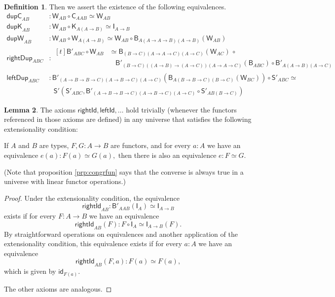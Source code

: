 \documentclass[a4paper]{article}
\theoremstyle{definition}
\newtheorem{definition}{Definition}[section]
\newtheorem{lemma}[definition]{Lemma}
\theoremstyle{remark}
\renewcommand{\equiv}{\simeq}
\newcommand{\nm}{\mathsf}
\newcommand{\id}{\nm{id}}
\newcommand{\combinator}{\nm}
\newcommand{\idFun}{\combinator{I}}
\newcommand{\constFun}{\combinator{K}}
\newcommand{\compFun}{\combinator{B'}}
\newcommand{\revCompFun}{\combinator{B}}
\newcommand{\swapFun}{\combinator{C}}
\newcommand{\dupFun}{\combinator{W}}
\newcommand{\substFun}{\combinator{S'}}
\begin{document}
\begin{definition}
  Then we assert the existence of the following equivalences.
  \begin{align*}
    \nm{dupC}_{AB}      &: \dupFun_{AB} \circ \swapFun_{AAB} \equiv \dupFun_{AB}\\
    \nm{dupK}_{AB}      &: \dupFun_{AB} \circ \constFun_{A(A{\to}B)} \equiv \idFun_{A{\to}B}\\
    \nm{dupW}_{AB}      &: \dupFun_{AB} \circ \dupFun_{A(A{\to}B)} \equiv \dupFun_{AB} \circ \revCompFun_{A(A{\to}A{\to}B)(A{\to}B)}(\dupFun_{AB})\\
    \nm{rightDup}_{ABC} &: \begin{aligned}[t]\compFun_{ABC} \circ \dupFun_{AB} &\equiv \revCompFun_{(B{\to}C)(A{\to}A{\to}C)(A{\to}C)}(\dupFun_{AC})\,\circ\\
                                                                               &\ \ \ \ \compFun_{(B{\to}C)((A{\to}B){\to}(A{\to}C))(A{\to}A{\to}C)}(\revCompFun_{ABC}) \circ \compFun_{A(A{\to}B)(A{\to}C)}\end{aligned}\\
    \nm{leftDup}_{ABC}  &: \compFun_{(A{\to}B{\to}B{\to}C)(A{\to}B{\to}C)(A{\to}C)}(\revCompFun_{A(B{\to}B{\to}C)(B{\to}C)}(\dupFun_{BC})) \circ \substFun_{ABC} \equiv\\
                        &\:\ \ \substFun(\substFun_{ABC},\compFun_{(A{\to}B{\to}B{\to}C)(A{\to}B{\to}C)(A{\to}C)} \circ \substFun_{AB(B{\to}C)})
  \end{align*}
\end{definition}

\begin{lemma}
  \label{lem:extensional}
  The axioms $\nm{rightId},\nm{leftId},\ldots$ hold trivially (whenever the functors
  referenced in those axioms are defined) in any universe that satisfies the following
  extensionality condition:

  If $A$ and $B$ are types, $F,G : A \to B$ are functors, and for every $a : A$ we have
  an equivalence $e(a) : F(a) \equiv G(a),$ then there is also an equivalence
  $e : F \equiv G.$
\end{lemma}

(Note that proposition \ref{prp:congrfun} says that the converse is always true in
a universe with linear functor operations.)

\begin{proof}
  Under the extensionality condition, the equivalence
  \[\nm{rightId}_{AB} : \compFun_{AAB}(\idFun_A) \equiv \idFun_{A{\to}B}\]
  exists if for every $F : A \to B$ we have an equivalence
  \[\nm{rightId}_{AB}(F) : F \circ \idFun_A \equiv \idFun_{A{\to}B}(F).\]
  By straightforward operations on equivalences and another application of the
  extensionality condition, this equivalence exists if for every $a : A$ we have an
  equivalence
  \[\nm{rightId}_{AB}(F,a) : F(a) \equiv F(a),\]
  which is given by $\id_{F(a)}.$

  The other axioms are analogous.
\end{proof}
\end{document}
